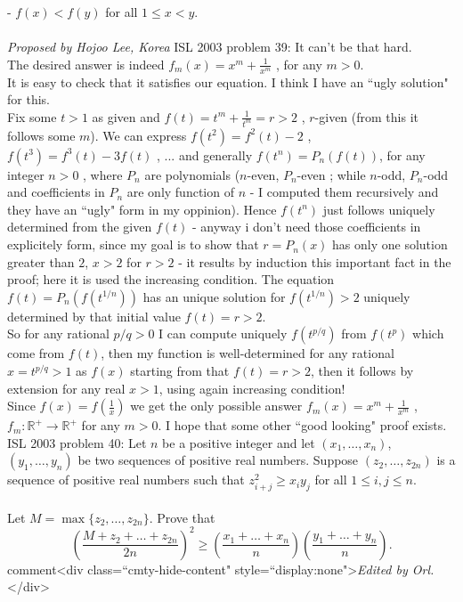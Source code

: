 - $f(x)<f(y)$ for all $1\le x<y$. \\\\
\textit{Proposed by Hojoo Lee, Korea} 
ISL 2003 problem 39:  It can't be that hard. \\
The desired answer is indeed $f_m(x)=x^m+\frac{1}{x^m}$ , for any $m>0$. \\
It is easy to check that it satisfies our equation. I think I have an ``ugly solution" for this. \\
Fix some $t>1$ as given and $f(t)=t^m+\frac{1}{t^m}=r>2$ , $r$-given (from this it follows some $m$). We can express $f(t^2)=f^2(t)-2$ , $f(t^3)=f^3(t)-3f(t)$ , ... and generally $f(t^n)=P_n(f(t))$, for any integer $n>0$ , where $P_n$ are polynomials ($n$-even, $P_n$-even ; while $n$-odd, $P_n$-odd and coefficients in $P_n$ are only function of $n$ - I computed them recursively and they have an ``ugly" form in my oppinion). Hence  $f(t^n)$ just follows uniquely determined from the given $f(t)$ - anyway i don't need those coefficients in explicitely form, since my goal is to show that $r=P_n(x)$ has only one solution greater than $2$, $x>2$ for $r>2$ - it results by induction this important fact in the proof; here it is used the increasing condition. The equation $f(t)=P_n(f(t^{1/n}))$ has an unique solution for $f(t^{1/n})>2$ uniquely determined by that initial value $f(t)=r>2$. \\
So for any rational $p/q>0$ I can compute uniquely  $f(t^{p/q})$ from $f(t^p)$ which come from $f(t)$, then my function is well-determined for any rational $x=t^{p/q}>1$ as $f(x)$ starting from that $f(t)=r>2$, then it follows by extension for any real $x>1$, using again increasing condition! \\
Since $f(x)=f(\frac{1}{x})$ we get the only possible answer $f_m(x)=x^m+\frac{1}{x^m}$ , $f_m: \mathbb{R}^+ \longrightarrow \mathbb{R}^+$ for any $m>0$. I hope that some other ``good looking" proof exists. 
ISL 2003 problem 40:  Let $n$ be a positive integer and let $(x_1,\ldots,x_n)$, $(y_1,\ldots,y_n)$ be two sequences of positive real numbers.  Suppose $(z_2,\ldots,z_{2n})$ is a sequence of positive real numbers such that $z_{i+j}^2 \geq x_iy_j$ for all $1\le i,j \leq n$. \\\\
Let $M=\max\{z_2,\ldots,z_{2n}\}$.  Prove that
\[
\left( \frac{M+z_2+\dots+z_{2n}}{2n} \right)^2
	\ge
	\left( \frac{x_1+\dots+x_n}{n} \right)
	\left( \frac{y_1+\dots+y_n}{n} \right).
\]
comment<div class=``cmty-hide-content" style=``display:none">\textit{Edited by Orl.}</div> \\\\
